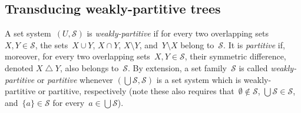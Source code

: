 \documentclass{lmcs} %
\newcommand*\defd[2][\em\color{red!25!black}]{{#1#2}}
\DeclareMathOperator*\symdiff{\bigtriangleup}
\begin{document}
\subsection{Transducing weakly-partitive trees}
\label{ssec:transduce partitive tree}
A set system~$(U,\mathcal{S})$ is \defd{weakly-partitive} if
for every two overlapping sets~$X,Y\in\mathcal{S}$,
the sets~$X\cup Y$, $X\cap Y$, $X\setminus Y$, and~$Y\setminus X$ belong to~$\mathcal{S}$.
It is \defd{partitive} if, moreover,
for every two overlapping sets~$X,Y\in\mathcal{S}$,
their symmetric difference, denoted \defd{$X\symdiff Y$},
also belongs to~$\mathcal{S}$.
By extension, a set family~$\mathcal{S}$ is called \defd{weakly-partitive} or \defd{partitive}
whenever $\left(\bigcup\mathcal{S},\mathcal{S}\right)$ is a set system\xspace%
which is weakly-partitive or partitive, respectively
(note these also requires that~$\emptyset\notin\mathcal{S}$, $\bigcup\mathcal{S}\in\mathcal{S}$, and~$\{a\}\in\mathcal{S}$ for every~$a\in\bigcup\mathcal{S}$).
\end{document}
